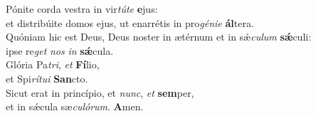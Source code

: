 \evenverse Pónite corda vestra in vir\textit{tú}\textit{te} \textbf{e}jus:~\*\\
\evenverse et distribúite domos ejus, ut enarrétis in pro\textit{gé}\textit{ni}\textit{e} \textbf{ál}tera.\\
\oddverse Quóniam hic est Deus, Deus noster in ætérnum et in sǽ\textit{cu}\textit{lum} \textbf{sǽ}culi:~\*\\
\oddverse ipse re\textit{get} \textit{nos} \textit{in} \textbf{sǽ}cula.\\
\evenverse Glória Pa\textit{tri}, \textit{et} \textbf{Fí}lio,~\*\\
\evenverse et Spi\textit{rí}\textit{tu}\textit{i} \textbf{San}cto.\\
\oddverse Sicut erat in princípio, et \textit{nunc}, \textit{et} \textbf{sem}per,~\*\\
\oddverse et in sǽcula sæ\textit{cu}\textit{ló}\textit{rum}. \textbf{A}men.\\
